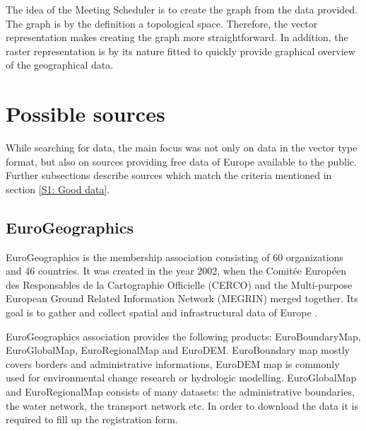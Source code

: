 \documentclass[thesis=M,english]{FITthesis}[2012/10/20]
\begin{document}

The idea of the Meeting Scheduler is to create the graph from the data provided. The graph is by the definition a topological space. Therefore, the vector representation makes creating the graph more straightforward. In addition, the raster representation is by its nature fitted to quickly provide graphical overview of the geographical data.

\section{Possible sources}
\label{sec:posSources}

While searching for data, the main focus was not only on data in the vector type format, but also on sources providing free data of Europe available to the public. Further subsections describe sources which match the criteria mentioned in section \ref{S1: Good data}.

 
\subsection{EuroGeographics}
EuroGeographics is the membership association consisting of 60 organizations and 46 countries. It was created in the year 2002, when the Comit{\' e}e Europ{\' e}en des Responsables de la Cartographie Officielle (CERCO) and the Multi-purpose European Ground Related Information Network (MEGRIN) merged together. Its goal is to gather and collect spatial and infrastructural data of Europe \cite{Euro16}. 

EuroGeographics association provides the following products: EuroBoundaryMap, EuroGlobalMap, EuroRegionalMap and EuroDEM.
EuroBoundary map mostly covers borders and administrative informations, EuroDEM map is commonly used for environmental change research or hydrologic modelling.
EuroGlobalMap and EuroRegionalMap consists of many datasets: the administrative boundaries, the water network, the transport network etc. 
In order to download the data it is required to fill up the registration form.
\end{document}
